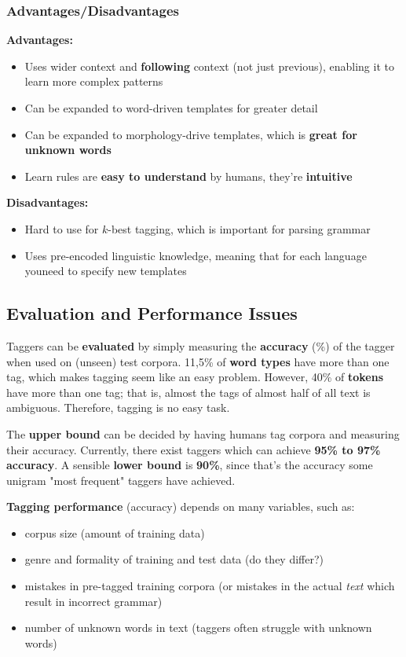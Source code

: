 \documentclass{article}
\begin{document}
\subsubsection{Advantages/Disadvantages}

\textbf{Advantages:}
\begin{itemize}
	\item Uses wider context and \textbf{following} context (not just previous), enabling it to learn more complex patterns
	\item Can be expanded to word-driven templates for greater detail
	\item Can be expanded to morphology-drive templates, which is \textbf{great for unknown words}
	\item Learn rules are \textbf{easy to understand} by humans, they're \textbf{intuitive}
\end{itemize}

\textbf{Disadvantages:}
\begin{itemize}
	\item Hard to use for $k$-best tagging, which is important for parsing grammar
	\item Uses pre-encoded linguistic knowledge, meaning that for each language youneed to specify new templates
\end{itemize}

\subsection{Evaluation and Performance Issues}

Taggers can be \textbf{evaluated} by simply measuring the \textbf{accuracy} (\%) of the tagger when used on (unseen) test corpora. 11,5\% of \textbf{word types} have more than one tag, which makes tagging seem like an easy problem. However, 40\% of \textbf{tokens} have more than one tag; that is, almost the tags of almost half of all text is ambiguous. Therefore, tagging is no easy task.

The \textbf{upper bound} can be decided by having humans tag corpora and measuring their accuracy. Currently, there exist taggers which can achieve \textbf{95\% to 97\% accuracy}. A sensible \textbf{lower bound} is \textbf{90\%}, since that's the accuracy some unigram "most frequent" taggers have achieved.

\textbf{Tagging performance} (accuracy) depends on many variables, such as:
\begin{itemize}
	\item corpus size (amount of training data)
	\item genre and formality of training and test data (do they differ?)
	\item mistakes in pre-tagged training corpora (or mistakes in the actual \textit{text} which result in incorrect grammar)
	\item number of unknown words in text (taggers often struggle with unknown words)
\end{itemize}
\end{document}
